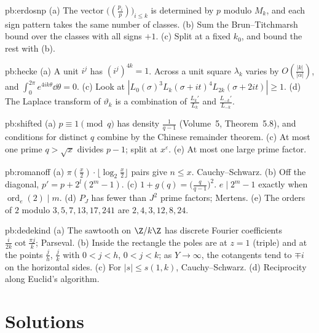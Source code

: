 \begin{hint}{pb:erdosnp}
(a) The vector $\bigl((\frac{p_i}p)\bigr)_{i\le k}$ is determined by $p$ modulo $M_k$, and each sign pattern takes the same number of classes. (b) Sum the Brun--Titchmarsh
bound over the classes with all signs $+1$. (c) Split at a fixed $k_0$, and bound the rest with (b).
\end{hint}

\begin{hint}{pb:hecke}
(a) A unit $i^j$ has $(i^j)^{4k}=1$. Across a unit square $\lambda_k$ varies by $O(\frac{|k|}{|\alpha|})$, and $\int_0^{2\pi}e^{4ik\theta}\dd\theta=0$. (c) Look at
$|L_0(\sigma)^3L_k(\sigma+it)^4L_{2k}(\sigma+2it)|\ge1$. (d) The Laplace transform of $\vartheta_k$ is a combination of $\frac{L_k'}{L_k}$ and $\frac{L_{-k}'}{L_{-k}}$.
\end{hint}

\begin{hint}{pb:shifted}
(a) $p\equiv1\pmod q$ has density $\frac1{q-1}$ (Volume~5, Theorem~5.8), and conditions for distinct $q$ combine by the Chinese remainder theorem. (c) At most one prime
$q>\sqrt x$ divides $p-1$; split at $x^\varepsilon$. (e) At most one large prime factor.
\end{hint}

\begin{hint}{pb:romanoff}
(a) $\pi(\frac x2)\cdot\lfloor\log_2\frac x2\rfloor$ pairs give $n\le x$. Cauchy--Schwarz. (b) Off the diagonal, $p'=p+2^l(2^m-1)$. (c) $1+g(q)=\bigl(\frac q{q-1}\bigr)^2$.
$e\mid2^m-1$ exactly when $\operatorname{ord}_e(2)\mid m$. (d) $P_J$ has fewer than $J^2$ prime factors; Mertens. (e) The orders of $2$ modulo $3,5,7,13,17,241$ are
$2,4,3,12,8,24$.
\end{hint}

\begin{hint}{pb:dedekind}
(a) The sawtooth on $\Z/k\Z$ has discrete Fourier coefficients $\frac i{2k}\cot\frac{\pi j}k$; Parseval. (b) Inside the rectangle the poles are at $z=1$ (triple) and at the
points $\frac jh$, $\frac jk$ with $0<j<h$, $0<j<k$; as $Y\to\infty$, the cotangents tend to $\mp i$ on the horizontal sides. (c) For $|s|\le s(1,k)$, Cauchy--Schwarz. (d) Reciprocity
along Euclid's algorithm.
\end{hint}

\section{Solutions}

